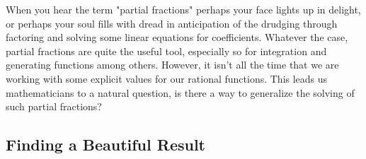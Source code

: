 When you hear the term "partial fractions" perhaps your face lights up in
delight, or perhaps your soul fills with dread in anticipation of the drudging
through factoring and solving some linear equations for coefficients.  Whatever the case, partial fractions are quite the useful tool, especially so for integration and generating functions among others. However, it isn't all the time that we are working with some explicit values for our rational functions. This leads us mathematicians to a natural question, is there a way to generalize the solving of such partial fractions?

\subsection{Finding a Beautiful Result}

